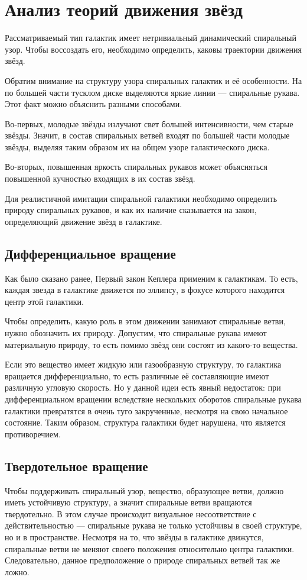\section{Анализ теорий движения звёзд}
Рассматриваемый тип галактик имеет нетривиальный динамический спиральный узор. Чтобы воссоздать его, необходимо определить, каковы траектории движения звёзд.

Обратим внимание на структуру узора спиральных галактик и её особенности. На по большей части тусклом диске выделяются яркие линии — спиральные рукава. Этот факт можно объяснить разными способами.

Во-первых, молодые звёзды излучают свет большей интенсивности, чем старые звёзды. Значит, в состав спиральных ветвей входят по большей части молодые звёзды, выделяя таким образом их на общем узоре галактического диска.

Во-вторых, повышенная яркость спиральных рукавов может объясняться повышенной кучностью входящих в их состав звёзд.

Для реалистичной имитации спиральной галактики необходимо определить природу спиральных рукавов, и как их наличие сказывается на закон, определяющий движение звёзд в галактике.

\subsection{Дифференциальное вращение}

Как было сказано ранее, Первый закон Кеплера применим к галактикам. То есть, каждая звезда в галактике движется по эллипсу, в фокусе которого находится центр этой галактики.

Чтобы определить, какую роль в этом движении занимают спиральные ветви, нужно обозначить их природу. Допустим, что спиральные рукава имеют материальную природу, то есть помимо звёзд они состоят из какого-то вещества.

Если это вещество имеет жидкую или газообразную структуру, то галактика вращается дифференциально, то есть различные её составляющие имеют различную угловую скорость. Но у данной идеи есть явный недостаток: при дифференциальном вращении вследствие нескольких оборотов спиральные рукава галактики превратятся в очень туго закрученные, несмотря на свою начальное состояние. Таким образом, структура галактики будет нарушена, что является противоречием.

\subsection{Твердотельное вращение}
Чтобы поддерживать спиральный узор, вещество, образующее ветви, должно иметь устойчивую структуру, а значит спиральные ветви вращаются твердотельно. В этом случае происходит визуальное несоответствие с действительностью — спиральные рукава не только устойчивы в своей структуре, но и в пространстве. Несмотря на то, что звёзды в галактике движутся, спиральные ветви не меняют своего положения относительно центра галактики. Следовательно, данное предположение о природе спиральных ветвей так же ложно.

